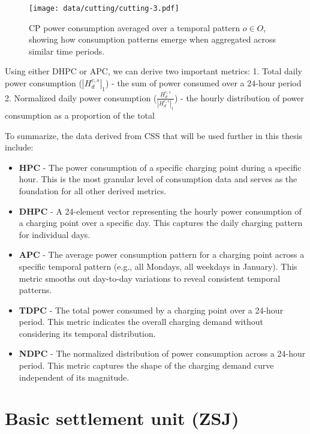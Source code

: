\begin{figure}
    \texttt{[image: data/cutting/cutting-3.pdf]}
    \caption{\acrlong{CP} power consumption averaged over a temporal pattern $o \in O$, showing how consumption patterns emerge when aggregated across similar time periods.}
\end{figure}

Using either \acrlong{DHPC} or \acrlong{APC}, we can derive two important metrics:
1. Total daily power consumption ($|H^{c,s}_{d}|_1$) - the sum of power consumed over a 24-hour period
2. Normalized daily power consumption ($\frac{H^{c,s}_d}{|H^{c,s}_d|_1}$) - the hourly distribution of power consumption as a proportion of the total

To summarize, the data derived from \acrlong{CSS} that will be used further in this thesis include:

\begin{itemize}
    \item \textbf{\acrlong{HPC}} - The power consumption of a specific charging point during a specific hour. This is the most granular level of consumption data and serves as the foundation for all other derived metrics.

    \item \textbf{\acrlong{DHPC}} - A 24-element vector representing the hourly power consumption of a charging point over a specific day. This captures the daily charging pattern for individual days.

    \item \textbf{\acrlong{APC}} - The average power consumption pattern for a charging point across a specific temporal pattern (e.g., all Mondays, all weekdays in January). This metric smooths out day-to-day variations to reveal consistent temporal patterns.

    \item \textbf{\acrlong{TDPC}} - The total power consumed by a charging point over a 24-hour period. This metric indicates the overall charging demand without considering its temporal distribution.

    \item \textbf{\acrlong{NDPC}} - The normalized distribution of power consumption across a 24-hour period. This metric captures the shape of the charging demand curve independent of its magnitude.
\end{itemize}



\section{Basic settlement unit (ZSJ)}

